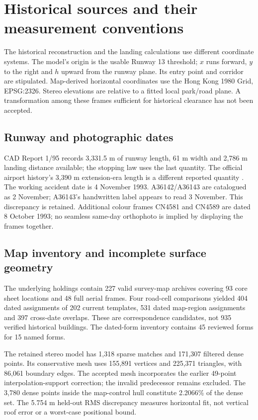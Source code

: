 \section{Historical sources and their measurement conventions}\label{app:sources}
The historical reconstruction and the landing calculations use different coordinate systems. The model's origin is the usable Runway 13 threshold; $x$ runs forward, $y$ to the right and $h$ upward from the runway plane. Its entry point and corridor are stipulated. Map-derived horizontal coordinates use the Hong Kong 1980 Grid, EPSG:2326. Stereo elevations are relative to a fitted local park/road plane. A transformation among these frames sufficient for historical clearance has not been accepted.

\subsection*{Runway and photographic dates}
CAD Report 1/95 records 3,331.5 m of runway length, 61 m width and 2,786 m landing distance available; the stopping law uses the last quantity. The official airport history's 3,390 m extension-era length is a different reported quantity \citep{cad,cadhistory}. The working accident date is 4 November 1993. A36142/A36143 are catalogued as 2 November; A36143's handwritten label appears to read 3 November. This discrepancy is retained. Additional colour frames CN4581 and CN4589 are dated 8 October 1993; no seamless same-day orthophoto is implied by displaying the frames together.

\subsection*{Map inventory and incomplete surface geometry}
The underlying holdings contain 227 valid survey-map archives covering 93 core sheet locations and 48 full aerial frames. Four road-cell comparisons yielded 404 dated assignments of 202 current templates, 531 dated map-region assignments and 397 cross-date overlaps. These are correspondence candidates, not 935 verified historical buildings. The dated-form inventory contains 45 reviewed forms for 15 named forms.

The retained stereo model has 1,318 sparse matches and 171,307 filtered dense points. Its conservative mesh uses 155,891 vertices and 225,371 triangles, with 86,061 boundary edges. The accepted mesh incorporates the earlier 49-point interpolation-support correction; the invalid predecessor remains excluded. The 3,780 dense points inside the map-control hull constitute 2.2066\% of the dense set. The 5.754 m held-out RMS discrepancy measures horizontal fit, not vertical roof error or a worst-case positional bound.

